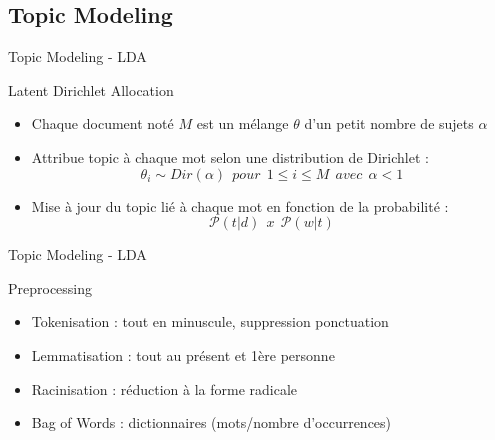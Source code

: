 \documentclass[10pt,sans,usenames,dvipsnames,english,compress]{beamer}
\begin{document}
\subsection{Topic Modeling}
\begin{frame}{Topic Modeling - LDA}
	\begin{exampleblock}{Latent Dirichlet Allocation}
		\begin{itemize}
            \item Chaque document noté $M$ est un mélange $\theta$ d’un petit nombre de sujets $\alpha$
            \item Attribue topic à chaque mot selon une distribution de Dirichlet : $$\theta_{i} \sim Dir(\alpha) \: \: pour \: \: 1 \leq i \leq M \: \: avec \: \: \alpha < 1$$
            \item Mise à jour du topic lié à chaque mot en fonction de la probabilité : $$\mathcal{P}(t | d) \: \: x \: \: \mathcal{P}(w | t)$$
          \end{itemize}
	\end{exampleblock}


\end{frame}

\begin{frame}{Topic Modeling - LDA}
	\begin{exampleblock}{Preprocessing}
            \begin{itemize}
            \item Tokenisation : tout en minuscule, suppression ponctuation
            \item Lemmatisation : tout au présent et 1ère personne
            \item Racinisation : réduction à la forme radicale
            \item Bag of Words : dictionnaires (mots/nombre d’occurrences)
            \end{itemize}
	\end{exampleblock}

\end{frame}
\end{document}
